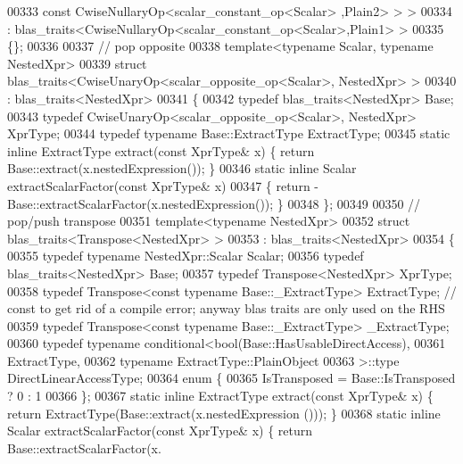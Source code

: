 \begin{DoxyCode}
00333                                                             const CwiseNullaryOp<scalar\_constant\_op<Scalar>
      ,Plain2> > >
00334  : blas\_traits<CwiseNullaryOp<scalar\_constant\_op<Scalar>,Plain1> >
00335 \{\};
00336 
00337 \textcolor{comment}{// pop opposite}
00338 \textcolor{keyword}{template}<\textcolor{keyword}{typename} Scalar, \textcolor{keyword}{typename} NestedXpr>
00339 \textcolor{keyword}{struct }blas\_traits<CwiseUnaryOp<scalar\_opposite\_op<Scalar>, NestedXpr> >
00340  : blas\_traits<NestedXpr>
00341 \{
00342   \textcolor{keyword}{typedef} blas\_traits<NestedXpr> Base;
00343   \textcolor{keyword}{typedef} CwiseUnaryOp<scalar\_opposite\_op<Scalar>, NestedXpr> XprType;
00344   \textcolor{keyword}{typedef} \textcolor{keyword}{typename} Base::ExtractType ExtractType;
00345   \textcolor{keyword}{static} \textcolor{keyword}{inline} ExtractType extract(\textcolor{keyword}{const} XprType& x) \{ \textcolor{keywordflow}{return} Base::extract(x.nestedExpression()); \}
00346   \textcolor{keyword}{static} \textcolor{keyword}{inline} Scalar extractScalarFactor(\textcolor{keyword}{const} XprType& x)
00347   \{ \textcolor{keywordflow}{return} - Base::extractScalarFactor(x.nestedExpression()); \}
00348 \};
00349 
00350 \textcolor{comment}{// pop/push transpose}
00351 \textcolor{keyword}{template}<\textcolor{keyword}{typename} NestedXpr>
00352 \textcolor{keyword}{struct }blas\_traits<Transpose<NestedXpr> >
00353  : blas\_traits<NestedXpr>
00354 \{
00355   \textcolor{keyword}{typedef} \textcolor{keyword}{typename} NestedXpr::Scalar Scalar;
00356   \textcolor{keyword}{typedef} blas\_traits<NestedXpr> Base;
00357   \textcolor{keyword}{typedef} Transpose<NestedXpr> XprType;
00358   \textcolor{keyword}{typedef} Transpose<const typename Base::\_ExtractType>  ExtractType; \textcolor{comment}{// const to get rid of a compile
       error; anyway blas traits are only used on the RHS}
00359   \textcolor{keyword}{typedef} Transpose<const typename Base::\_ExtractType> \_ExtractType;
00360   \textcolor{keyword}{typedef} \textcolor{keyword}{typename} conditional<bool(Base::HasUsableDirectAccess),
00361     ExtractType,
00362     \textcolor{keyword}{typename} ExtractType::PlainObject
00363     >::type DirectLinearAccessType;
00364   \textcolor{keyword}{enum} \{
00365     IsTransposed = Base::IsTransposed ? 0 : 1
00366   \};
00367   \textcolor{keyword}{static} \textcolor{keyword}{inline} ExtractType extract(\textcolor{keyword}{const} XprType& x) \{ \textcolor{keywordflow}{return} ExtractType(Base::extract(x.nestedExpression
      ())); \}
00368   \textcolor{keyword}{static} \textcolor{keyword}{inline} Scalar extractScalarFactor(\textcolor{keyword}{const} XprType& x) \{ \textcolor{keywordflow}{return} Base::extractScalarFactor(x.

\end{DoxyCode}
